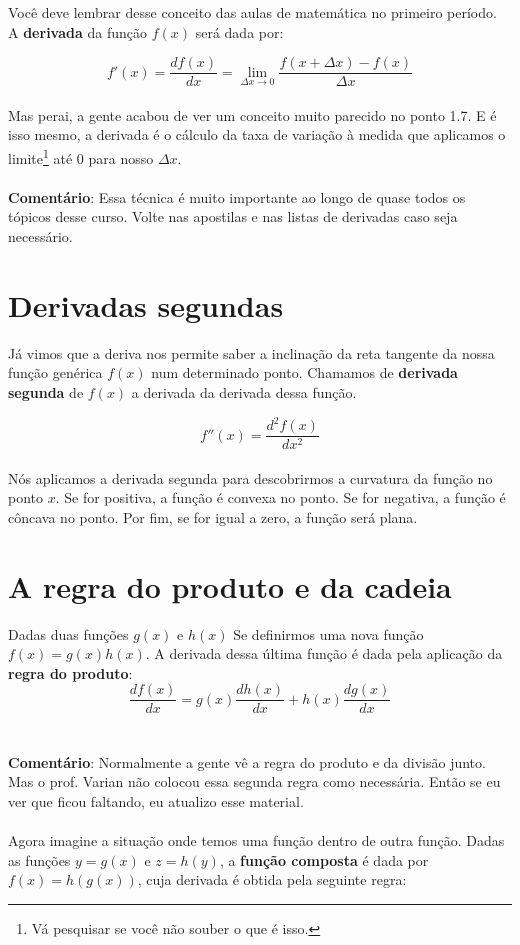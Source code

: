 \documentclass[a4paper,11pt,oneside]{book}
\theoremstyle{definition}
\theoremstyle{break}
\begin{document}
Você deve lembrar desse conceito das aulas de matemática no primeiro período. A \textbf{derivada} da função $f(x)$ será dada por:

$$ f'(x) = \frac{df(x)}{dx} = \lim_{\Delta x \to 0} \frac{f(x + \Delta x) - f(x)}{\Delta x} $$
\\
Mas perai, a gente acabou de ver um conceito muito parecido no ponto 1.7. E é isso mesmo, a derivada é o cálculo da taxa de variação à medida que aplicamos o limite\footnote{Vá pesquisar se você não souber o que é isso.} até $0$ para nosso $\Delta x$.
\\
\\
\textbf{Comentário}: Essa técnica é muito importante ao longo de quase todos os tópicos desse curso. Volte nas apostilas e nas listas de derivadas caso seja necessário.

\section{Derivadas segundas}

Já vimos que a deriva nos permite saber a inclinação da reta tangente da nossa função genérica $f(x)$ num determinado ponto. Chamamos de \textbf{derivada segunda} de $f(x)$ a derivada da derivada dessa função.

$$ f''(x) = \frac{d^2f(x)}{dx^2} $$
\\
Nós aplicamos a derivada segunda para descobrirmos a curvatura da função no ponto $x$. Se for positiva, a função é convexa no ponto. Se for negativa, a função é côncava no ponto. Por fim, se for igual a zero, a função será plana.

\section{A regra do produto e da cadeia}

Dadas duas funções $g(x)$ e $h(x)$ Se definirmos uma nova função $f(x) = g(x) h(x)$. A derivada dessa última função é dada pela aplicação da \textbf{regra do produto}:
\\
$$ \frac{df(x)}{dx} = g(x)\frac{dh(x)}{dx} + h(x)\frac{dg(x)}{dx}$$
\\
\\
\textbf{Comentário}: Normalmente a gente vê a regra do produto e da divisão junto. Mas o prof. Varian não colocou essa segunda regra como necessária. Então se eu ver que ficou faltando, eu atualizo esse material.
\\
\\
Agora imagine a situação onde temos uma função dentro de outra função. Dadas as funções $y = g(x)$ e $z = h(y)$, a \textbf{função composta} é dada por $f(x) = h(g(x))$, cuja derivada é obtida pela seguinte regra:
\end{document}
